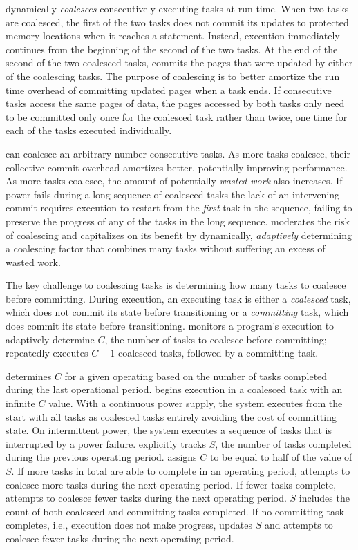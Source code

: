 \sys dynamically {\em coalesces} consecutively executing tasks at run time. When two tasks are coalesced, the first of the two tasks does not commit its updates to protected memory locations when it reaches a \transition statement. Instead, execution immediately continues from the beginning of the second of the two tasks. At the end of the second of the two coalesced tasks, \sys commits the pages that were updated by either of the coalescing tasks. The purpose of coalescing is to better amortize the run time overhead of committing updated pages when a task ends. If consecutive tasks access the same pages of data, the pages accessed by both tasks only need to be committed only once for the coalesced task rather than twice, one time for each of the tasks executed individually.  

\sys can coalesce an arbitrary number consecutive tasks. As more tasks coalesce, their collective commit overhead amortizes better, potentially improving performance. As more tasks coalesce, the amount of potentially {\em wasted work} also increases. If power fails during a long sequence of coalesced tasks the lack of an intervening commit requires execution to restart from the {\em first} task in the sequence, failing to preserve the progress of any of
the tasks in the long sequence. \sys moderates the risk of coalescing and capitalizes on its benefit by dynamically, \emph{adaptively} determining a coalescing factor that combines many tasks without suffering an excess of wasted work. 

The key challenge to coalescing tasks is determining how many tasks to coalesce before committing. During execution, an executing task is either a {\em coalesced} task, which does not commit its state before transitioning or a {\em committing} task, which does commit its state before transitioning. \sys monitors a program's execution to adaptively determine $C$, the number of tasks to coalesce before committing; \sys repeatedly executes $C-1$ coalesced tasks, followed by a committing task.  

\sys determines $C$ for a given operating based on the number of tasks completed during the last operational period. \sys begins execution in a coalesced task with an infinite $C$ value. With a continuous power supply, the system executes from the start with all tasks as coalesced tasks entirely avoiding the cost of committing state. On intermittent power, the system executes a sequence of tasks that is interrupted by a power failure. \sys explicitly tracks $S$, the number of tasks completed during the previous operating period. \sys assigns $C$ to be equal to half of the value of $S$. If more tasks in total are able to complete in an operating period, \sys attempts to coalesce more tasks during the next operating period. If fewer tasks complete, \sys attempts to coalesce fewer tasks during the next operating period. $S$ includes the count of both coalesced and committing tasks completed. If no committing task completes, i.e., execution does not make progress, \sys updates $S$ and attempts to coalesce fewer tasks during the next operating period.

